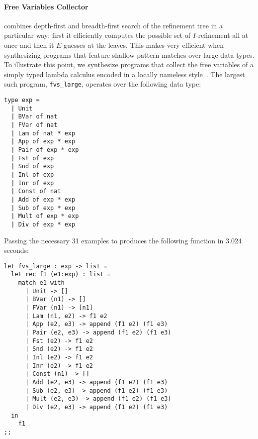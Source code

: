 \paragraph{Free Variables Collector}

\myth{} combines depth-first and breadth-first search of the refinement tree in a particular way: first it efficiently computes the possible set of $I$-refinement all at once and then it $E$-guesses at the leaves.
This makes \myth{} very efficient when synthesizing programs that feature shallow pattern matches over large data types.
To illustrate this point, we synthesize programs that collect the free variables of a simply typed lambda calculus encoded in a locally nameless style~.
The largest such program, \texttt{fvs\_large}, operates over the following data type:

\begin{center}
  \begin{minipage}{0.75\textwidth}
    \begin{lstlisting}
type exp =
  | Unit
  | BVar of nat
  | FVar of nat
  | Lam of nat * exp
  | App of exp * exp
  | Pair of exp * exp
  | Fst of exp
  | Snd of exp
  | Inl of exp
  | Inr of exp
  | Const of nat
  | Add of exp * exp
  | Sub of exp * exp
  | Mult of exp * exp
  | Div of exp * exp
    \end{lstlisting}
  \end{minipage}
\end{center}

Passing the necessary 31 examples to \myth{} produces the following function in 3.024 seconds:

\begin{center}
  \begin{minipage}{0.75\textwidth}
    \begin{lstlisting}
let fvs_large : exp -> list =
  let rec f1 (e1:exp) : list =
    match e1 with
      | Unit -> []
      | BVar (n1) -> []
      | FVar (n1) -> [n1]
      | Lam (n1, e2) -> f1 e2
      | App (e2, e3) -> append (f1 e2) (f1 e3)
      | Pair (e2, e3) -> append (f1 e2) (f1 e3)
      | Fst (e2) -> f1 e2
      | Snd (e2) -> f1 e2
      | Inl (e2) -> f1 e2
      | Inr (e2) -> f1 e2
      | Const (n1) -> []
      | Add (e2, e3) -> append (f1 e2) (f1 e3)
      | Sub (e2, e3) -> append (f1 e2) (f1 e3)
      | Mult (e2, e3) -> append (f1 e2) (f1 e3)
      | Div (e2, e3) -> append (f1 e2) (f1 e3)
  in
    f1
;;
    \end{lstlisting}
  \end{minipage}
\end{center}

